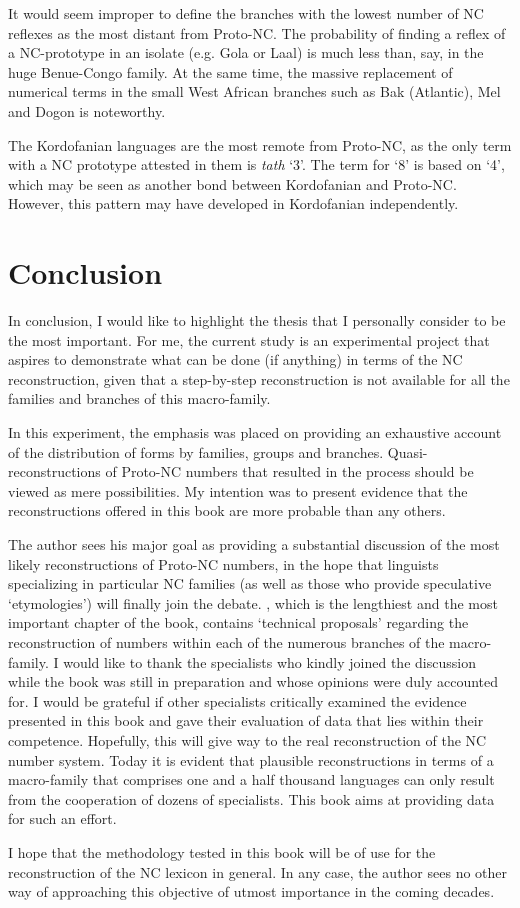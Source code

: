 It would seem improper to define the branches with the lowest number of NC reflexes as the most distant from Proto-NC. The probability of finding a reflex of a NC-prototype in an isolate (e.g. Gola or Laal) is much less than, say, in the huge Benue-Congo family. At the same time, the massive replacement of numerical terms in the small West African branches such as Bak (Atlantic), Mel and Dogon is noteworthy.

The Kordofanian languages are the most remote from Proto-NC, as the only term with a NC prototype attested in them is \textit{tath} ‘3’. The term for ‘8’ is based on ‘4’, which may be seen as another bond between Kordofanian and Proto-NC. However, this pattern may have developed in Kordofanian independently. 


\section{Conclusion}
In conclusion, I would like to highlight the thesis that I personally consider to be the most important. For me, the current study is an experimental project that aspires to demonstrate what can be done (if anything) in terms of the NC reconstruction, given that a step-by-step reconstruction is not available for all the families and branches of this macro-family.

In this experiment, the emphasis was placed on providing an exhaustive account of the distribution of forms by families, groups and branches. Quasi-recon\-structions of Proto-NC numbers that resulted in the process should be viewed as mere possibilities. My intention was to present evidence that the reconstructions offered in this book are more probable than any others. 
 
The author sees his major goal as providing a substantial discussion of the most likely reconstructions of Proto-NC numbers, in the hope that linguists specializing in particular NC families (as well as those who provide speculative ‘etymologies’) will finally join the debate. , which is the lengthiest and the most important chapter of the book, contains ‘technical proposals’ regarding the reconstruction of numbers within each of the numerous branches of the macro-family. I would like to thank the specialists who kindly joined the discussion while the book was still in preparation and whose opinions were duly accounted for. I would be grateful if other specialists critically examined the evidence presented in this book and gave their evaluation of data that lies within their competence. Hopefully, this will give way to the real reconstruction of the NC number system. Today it is evident that plausible reconstructions in terms of a macro-family that comprises one and a half thousand languages can only result from the cooperation of dozens of specialists. This book aims at providing data for such an effort.  

I hope that the methodology tested in this book will be of use for the reconstruction of the NC lexicon in general. In any case, the author sees no other way of approaching this objective of utmost importance in the coming decades.

